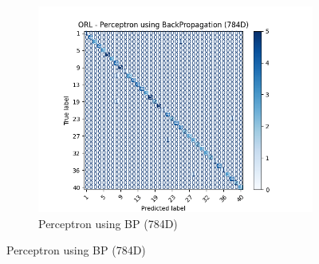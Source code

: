 \begin{figure}[htbp]
\begin{subfigure}[b]{0.33\linewidth}
        \end{subfigure}
        \begin{subfigure}[b]{0.33\linewidth}
                \centering
                \includegraphics[width=1\linewidth]{../source/orl/pictures/perceptronBP-confusion-784d.png}
                \caption{Perceptron using BP (784D)}
                \label{fig:orl-confusion-pbp-784}
        \end{subfigure}


\end{figure}
